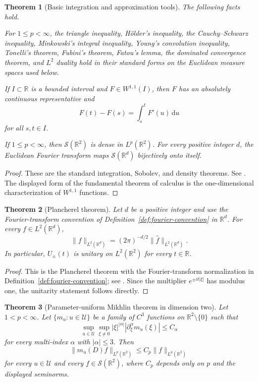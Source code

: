\documentclass[11pt]{article}
\numberwithin{equation}{section}
\newtheorem{theorem}{Theorem}[section]
\theoremstyle{definition}
\theoremstyle{remark}
\newcommand{\R}{\mathbb R}
\newcommand{\Sch}{\mathcal S}
\newcommand{\dd}{\,\mathrm d}
\begin{document}
\begin{theorem}[Basic integration and approximation tools]\label{thm:basic-analysis}
The following facts hold.

For $1\le p<\infty$, the triangle inequality, H\"older's inequality, the Cauchy--Schwarz inequality, Minkowski's integral inequality, Young's convolution inequality, Tonelli's theorem, Fubini's theorem, Fatou's lemma, the dominated convergence theorem, and $L^2$ duality hold in their standard forms on the Euclidean measure spaces used below.

If $I\subset\R$ is a bounded interval and $F\in W^{1,1}(I)$, then $F$ has an absolutely continuous representative and
\[
F(t)-F(s)=\int_s^tF'(u)\dd u
\]
for all $s,t\in I$.

If $1\le p<\infty$, then $\Sch(\R^2)$ is dense in $L^p(\R^2)$.  For every positive integer $d$, the Euclidean Fourier transform maps $\Sch(\R^d)$ bijectively onto itself.
\end{theorem}

\begin{proof}
These are the standard integration, Sobolev, and density theorems.  See \cite[Chapters~2, 3, and 8]{Folland1999}.  The displayed form of the fundamental theorem of calculus is the one-dimensional characterization of $W^{1,1}$ functions.
\end{proof}

\begin{theorem}[Plancherel theorem]\label{thm:plancherel}
Let $d$ be a positive integer and use the Fourier-transform convention of Definition~\ref{def:fourier-convention} in $\R^d$.  For every $f\in L^2(\R^d)$,
\[
\|f\|_{L^2(\R^d)}=(2\pi)^{-d/2}\|\widehat f\|_{L^2(\R^d)}.
\]
In particular, $U_\pm(t)$ is unitary on $L^2(\R^2)$ for every $t\in\R$.
\end{theorem}

\begin{proof}
This is the Plancherel theorem with the Fourier-transform normalization in Definition~\ref{def:fourier-convention}; see \cite[Section~8.3]{Folland1999}.  Since the multiplier $e^{\pm it|\xi|}$ has modulus one, the unitarity statement follows directly.
\end{proof}

\begin{theorem}[Parameter-uniform Mikhlin theorem in dimension two]\label{thm:mikhlin}
Let $1<p<\infty$.  Let $\{m_u:u\in\mathcal U\}$ be a family of $C^3$ functions on $\R^2\setminus\{0\}$ such that
\[
\sup_{u\in\mathcal U}\sup_{\xi\ne0}|\xi|^{|\alpha|}|\partial_\xi^\alpha m_u(\xi)|\le C_\alpha
\]
for every multi-index $\alpha$ with $|\alpha|\le3$.  Then
\[
\|m_u(D)f\|_{L^p(\R^2)}\le C_p\|f\|_{L^p(\R^2)}
\]
for every $u\in\mathcal U$ and every $f\in\Sch(\R^2)$, where $C_p$ depends only on $p$ and the displayed seminorms.
\end{theorem}
\end{document}
